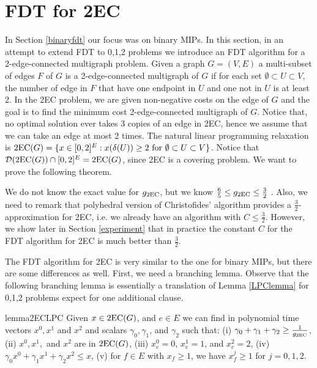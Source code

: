 \documentclass[runningheads]{llncs}
\begin{document}
\section{FDT for 2EC}\label{2EC}

In Section \ref{binaryfdt} our focus was on binary MIPs. In this section, in an attempt to extend FDT to 0,1,2 problems we introduce an FDT algorithm for a 2-edge-connected multigraph problem. Given a graph $G=(V,E)$ a multi-subset of edges $F$ of $G$ is a 2-edge-connected multigraph of $G$ if for each set $\emptyset\subset U \subset V$, the number of edge in $F$ that have one endpoint in $U$ and one not in $U$ is at least 2. In the 2EC problem, we are given non-negative costs on the edge of $G$ and the goal is to find the minimum cost 2-edge-connected multigraph of $G$. Notice that, no optimal solution ever takes 3 copies of an edge in 2EC, hence we assume that we can take an edge at most 2 times. The natural linear programming relaxation is $\operatorname{2EC}(G) = \{x\in [0,2]^E: x(\delta(U))\geq 2 \mbox{ for } \emptyset \subset U \subset V\}$. Notice that $\operatorname{\mathcal{D}}(\operatorname{2EC}(G))\cap [0,2]^{E} = \operatorname{2EC}(G)$, since 2EC is a covering problem. We want to prove the following theorem. 

\FDTEC*

We do not know the exact value for $g_{\operatorname{2EC}}$, but we know $\frac{6}{5} \leq g_{\operatorname{2EC}} \leq \frac{3}{2}$ \cite{carr-ravi,Wolsey1980}. Also, we need to remark that polyhedral version of Christofides' algorithm provides a $\frac{3}{2}$-approximation for 2EC, i.e. we already have an algorithm with $C\leq \frac{3}{2}$. However, we show later in Section \ref{experiment} that in practice the constant $C$ for the FDT algorithm for 2EC is much better than $\frac{3}{2}$. 

The FDT algorithm for 2EC is very similar to the one for binary MIPs, but there are some differences as well. First, we need a branching lemma. Observe that  the following branching lemma is essentially a translation of Lemma \ref{LPClemma} for 0,1,2 problems expect for one additional clause. 


\begin{restatable}{lemma}{2ECLPC}
	\label{LPC2EC}
	Given $x\in \operatorname{2EC}(G)$, and $e\in E$ we can find in polynomial time vectors $x^0,x^1$ and $x^2$ and scalars $\gamma_0,\gamma_1$, and $\gamma_2$ such that: (i) $\gamma_0 + \gamma_1 +\gamma_2 \geq \frac{ 1}{g_{\operatorname{2EC}}}$, (ii) $x^0,x^1,$ and $x^2$ are in  $ \operatorname{2EC}(G)$, (iii) $x^0_e=0$, $x^1_e=1$, and $x^2_e=2$, (iv) $\gamma_0 x^0 + \gamma_1{x}^1  + \gamma_2x^2\leq {x}$, (v) for $f\in E$ with ${x}_f\geq 1$, we have $x^j_f\geq 1$ for $j=0,1,2$.
\end{restatable}
\end{document}
